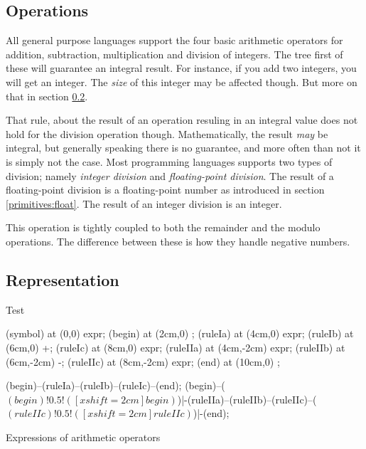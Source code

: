 \subsection{Operations}

All general purpose languages support the four basic arithmetic operators for addition, subtraction, multiplication and division of integers. The tree first of these will guarantee an integral result. For instance, if you add two integers, you will get an integer. The \textsl{size} of this integer may be affected though. But more on that in section \ref{primitives:int:representation}.

That rule, about the result of an operation resuling in an integral value does not hold for the division operation though. Mathematically, the result \textsl{may} be integral, but generally speaking there is no guarantee, and more often than not it is simply not the case. Most programming languages supports two types of division; namely \textsl{integer division} and \textsl{floating-point division}. The result of a floating-point division is a floating-point number as introduced in section \ref{primitives:float}. The result of an integer division is an integer.

This operation is tightly coupled to both the remainder and the modulo operations. The difference between these is how they handle negative numbers.


\subsection{Representation}
\label{primitives:int:representation}



\csharpsubsection{\csharp}

\begin{syntaxsegment}
  Test
\end{syntaxsegment}

\begin{syntaxfloat}
  \begin{syntax}
    \node[nonterminal] (symbol)  at (0,0) {expr};
    \node[empty]       (begin)   at (2cm,0) {};
    \node[nonterminal] (ruleIa)  at (4cm,0) {expr};
    \node[terminal]    (ruleIb)  at (6cm,0) {+};
    \node[nonterminal] (ruleIc)  at (8cm,0) {expr};
    \node[nonterminal] (ruleIIa) at (4cm,-2cm) {expr};
    \node[terminal]    (ruleIIb) at (6cm,-2cm) {-};
    \node[nonterminal] (ruleIIc) at (8cm,-2cm) {expr};
    \node[empty]       (end)     at (10cm,0) {};
    
    \draw[path] (begin)--(ruleIa)--(ruleIb)--(ruleIc)--(end);
    \draw[path] (begin)--($(begin)!0.5!([xshift=2cm]begin)$)|-(ruleIIa)--(ruleIIb)--(ruleIIc)--($(ruleIIc)!0.5!([xshift=2cm]ruleIIc)$)|-(end);
  \end{syntax}
  \caption{Expressions of arithmetic operators}
\end{syntaxfloat}

